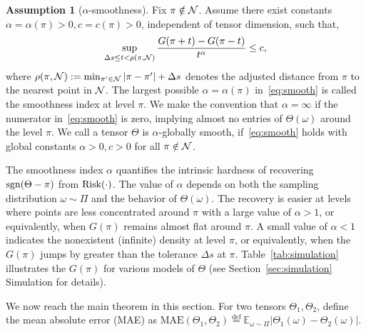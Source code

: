 \documentclass[11pt]{article}
\theoremstyle{plain}
\theoremstyle{definition}
\newtheorem{assumption}{Assumption}
\def\sign{\textup{sgn}}
\def\risk{\textup{Risk}}
\begin{document}
\begin{assumption}[$\alpha$-smoothness]\label{ass:margin} Fix $\pi \notin \mathcal{N}$. Assume there exist constants $\alpha=\alpha(\pi)> 0, c=c(\pi) >0$, independent of tensor dimension, such that, 
\begin{equation}\label{eq:smooth}
\sup_{\Delta s \leq t<\rho(\pi, \mathcal{N})}{G(\pi+{t})-G(\pi-{t})\over t^\alpha} \leq c,
\end{equation}
where $\rho(\pi,\mathcal{N}):=\min_{\pi'\in \mathcal{N}}|\pi-\pi'|+\Delta s$ denotes the adjusted distance from $\pi$ to the nearest point in $\mathcal{N}$. The largest possible $\alpha=\alpha(\pi)$ in~\eqref{eq:smooth} is called the smoothness index at level $\pi$. We make the convention that $\alpha=\infty$ if the numerator in~\eqref{eq:smooth} is zero, implying almost no entries of $\Theta(\omega)$ around the level $\pi$. We call a tensor $\Theta$ is $\alpha$-globally smooth, if~\eqref{eq:smooth} holds with global constants $\alpha>0, c>0$ for all $\pi\notin\mathcal{N}$. 
\end{assumption}

The smoothness index $\alpha$ quantifies the intrinsic hardness of recovering $\sign(\Theta-\pi)$ from $\risk(\cdot)$. 
The value of $\alpha$ depends on both the sampling distribution $\omega\sim \Pi$ and the behavior of $\Theta(\omega)$. 
The recovery is easier at levels where points are less concentrated around $\pi$ with a large value of $\alpha>1$, or equivalently, when $G(\pi)$ remains almost  flat around $\pi$. A small value of $\alpha<1$ indicates the nonexistent (infinite) density at level $\pi$, or equivalently, when the $G(\pi)$ jumps by greater than the tolerance $\Delta s$ at $\pi$. Table~\ref{tab:simulation} illustrates the $G(\pi)$ for various models of $\Theta$ (see Section~\ref{sec:simulation} Simulation for details). 


We now reach the main theorem in this section. For two tensors $\Theta_1,\Theta_2$, define the mean absolute error (MAE) as
$\text{MAE}(\Theta_1, \Theta_2)\stackrel{\text{def}}{=}\mathbb{E}_{\omega\sim \Pi}|\Theta_1(\omega)-\Theta_2(\omega)|.$
\end{document}
